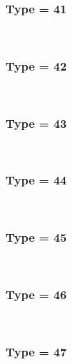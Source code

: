 \documentclass{article}
\begin{document}
        
        
            \subsubsection*{Type = 41}    
            
            \\
        
        
        
            \subsubsection*{Type = 42}    
            
            \\
        
        
        
            \subsubsection*{Type = 43}    
            
            \\
        
        
        
            \subsubsection*{Type = 44}    
            
            \\
        
        
        
            \subsubsection*{Type = 45}    
            
            \\
        
        
        
            \subsubsection*{Type = 46}    
            
            \\
        
        
        
            \subsubsection*{Type = 47}    
            
\end{document}
